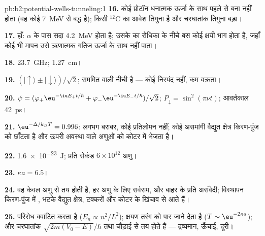 \begin{solution}{pb:b2:potential-wells-tunneling:1}
\textbf{16.} कोई प्रोटॉन धनात्मक ऊर्जा के साथ पहले से बना नहीं होता (वह कोई
\qty{7}{MeV} से बद्ध है); किसी $^{12}$C का आवेश तिगुना है और
चरघातांक तिगुना बड़ा।

\textbf{17.} हाँ: $\alpha$ के पास सदा \qty{4.2}{MeV} होता है; उसके  का
रोधिका के नीचे बस कोई क्षयी भाग होता है, जहाँ कोई भी मापन
उसे ऋणात्मक गतिज ऊर्जा के साथ नहीं पाता।

\textbf{18.} \qty{23.7}{GHz}; \qty{1.27}{cm}।

\textbf{19.} $(|{\uparrow}\rangle \pm |{\downarrow}\rangle)/\sqrt2$;
सममित वाली नीची है --- कोई निस्पंद नहीं, कम वक्रता।

\textbf{20.} $\psi = (\varphi_+\eu^{-\iu E_+t/\hbar} + \varphi_-\eu^{-\iu E_-t/\hbar})/\sqrt2$;
$P_{\downarrow} = \sin^2(\pi\nu t)$; आवर्तकाल \qty{42}{ps}।

\textbf{21.} $\eu^{-\Delta/k_BT} = 0.996$: लगभग बराबर, कोई प्रतिलोमन नहीं; कोई
असमांगी वैद्युत क्षेत्र किरण-पुंज को छाँटता है और ऊपरी अवस्था वाले
अणुओं को कोटर में भेजता है।

\textbf{22.} \qty{1.6e-23}{J}; प्रति सेकंड $6 \times 10^{12}$ अणु।

\textbf{23.} $\kappa a = 6.5$।

\textbf{24.} वह केवल अणु से तय होती है, हर अणु के लिए सर्वसम, और
बाहर के प्रति असंवेदी; विस्थापन किरण-पुंज में ,
भटके वैद्युत क्षेत्र, टक्करों और कोटर के खिंचाव से आते हैं।

\textbf{25.} परिरोध क्वांटित करता है ($E_n \propto n^2/L^2$); क्षयण तरंग को
पार जाने देता है ($T \sim \eu^{-2\kappa a}$); और चरघातांक
$\sqrt{2m(V_0 - E)}/\hbar$ तथा चौड़ाई से तय होते हैं --- द्रव्यमान, ऊँचाई, दूरी।
\end{solution}
